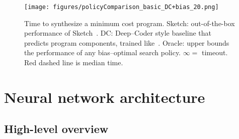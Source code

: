 \documentclass{article}
\begin{document}
\begin{figure}
  \texttt{[image: figures/policyComparison\_basic\_DC+bias\_20.png]}
    \caption{Time to synthesize a minimum cost program. Sketch: out-of-the-box performance of Sketch~\citep{solar2008program}. DC: Deep--Coder style baseline that predicts program components, trained like~\cite{BalGauBroetal16}. Oracle:  upper bounds  the performance of any bias--optimal search policy. $\infty = $ timeout. Red dashed line is median time.}
  \end{figure}
\pagebreak
\section{Neural network architecture}

\subsection{High-level overview}
\tikzset{>=latex}
\end{document}

